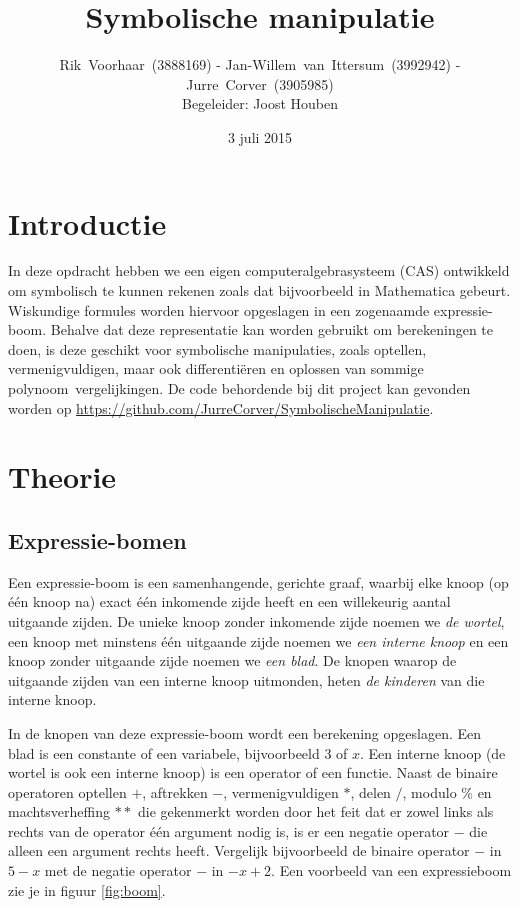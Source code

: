 \documentclass[a4paper]{article}
\title{Symbolische manipulatie}
\author{Rik~Voorhaar~(3888169) - Jan-Willem~van~Ittersum~(3992942) - Jurre~Corver~(3905985)\\
Begeleider: Joost Houben}
\date{3 juli 2015}
\begin{document}
\maketitle
\thispagestyle{empty}
\clearpage


\setcounter{page}{1}

\section{Introductie}
In deze opdracht hebben we een eigen computeralgebrasysteem (CAS) ontwikkeld om symbolisch te kunnen rekenen zoals dat bijvoorbeeld in Mathematica gebeurt. Wiskundige formules worden hiervoor opgeslagen in een zogenaamde expressie-boom. Behalve dat deze representatie kan worden gebruikt om berekeningen te doen, is deze geschikt voor symbolische manipulaties, zoals optellen, vermenigvuldigen, maar ook differenti\"eren en oplossen van sommige polynoom~vergelijkingen. De code behordende bij dit project kan gevonden worden op \url{https://github.com/JurreCorver/SymbolischeManipulatie}.


\section{Theorie}
\subsection{Expressie-bomen}
Een expressie-boom is een samenhangende, gerichte graaf, waarbij elke knoop (op \'e\'en knoop na) exact \'e\'en inkomende zijde heeft en een willekeurig aantal uitgaande zijden. De unieke knoop zonder inkomende zijde noemen we \textit{de wortel}, een knoop met minstens \'e\'en uitgaande zijde noemen we \textit{een interne knoop} en een knoop zonder uitgaande zijde noemen we \textit{een blad}. De knopen waarop de uitgaande zijden van een interne knoop uitmonden, heten \textit{de kinderen} van die interne knoop.

In de knopen van deze expressie-boom wordt een berekening opgeslagen. Een blad is een constante of een variabele, bijvoorbeeld $3$ of $x$. Een interne knoop (de wortel is ook een interne knoop) is een operator of een functie. Naast de binaire operatoren optellen $+$, aftrekken $-$, vermenigvuldigen $*$, delen $/$, modulo $\%$ en machtsverheffing $**$ die gekenmerkt worden door het feit dat er zowel links als rechts van de operator \'e\'en argument nodig is, is er een negatie operator $-$ die alleen een argument rechts heeft. Vergelijk bijvoorbeeld de binaire operator $-$ in $5-x$ met de negatie operator $-$ in $-x+2$. Een voorbeeld van een expressieboom zie je in figuur \ref{fig:boom}. 
\end{document}
